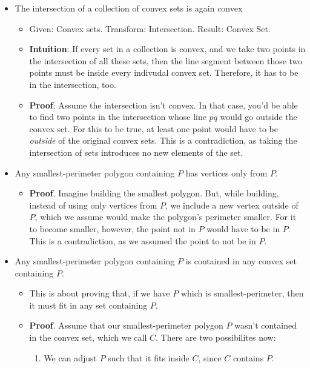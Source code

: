 \begin{itemize}
	\item The intersection of a collection of convex sets is again convex
	      \begin{itemize}
		      \item Given: Convex sets. Transform: Intersection. Result: Convex Set.
		      \item \textbf{Intuition}: If every set in a collection is convex, and we take two points in the intersection of all these sets, then the line segment between those two points must be inside every indivudal convex set. Therefore, it has to be in the intersection, too.
		      \item \textbf{Proof}: Assume the intersection isn't convex. In that case, you'd be able to find two points in the intersection whose line $\overline{pq}$ would go outside the convex set. For this to be true, at least one point would have to be \textit{outside} of the original convex sets. This is a contradiction, as taking the intersection of sets introduces no new elements of the set.
	      \end{itemize}
	\item Any smallest-perimeter polygon containing $P$ has vertices only from $P$.
	      \begin{itemize}
		      \item \textbf{Proof}. Imagine building the smallest polygon. But, while building, instead of using only vertices from $P$, we include a new vertex outside of $P$, which we assume would make the polygon's perimeter smaller. For it to become smaller, however, the point not in $P$ would have to be in $P$. This is a contradiction, as we assumed the point to not be in $P$.
	      \end{itemize}
	\item Any smallest-perimeter polygon containing $P$ is contained in any convex set containing $P$.
	      \begin{itemize}
		      \item This is about proving that, if we have $P$ which is smallest-perimeter, then it must fit in any set containing $P$.
		      \item \textbf{Proof}.
		            Assume that our smallest-perimeter polygon $P$ wasn't contained in the convex set, which we call $C$. There are two possibilites now:
		            \begin{enumerate}
			            \item We can adjust $P$ such that it fits inside $C$, since $C$ contains $P$.

\end{enumerate}
\end{itemize}
\end{itemize}
